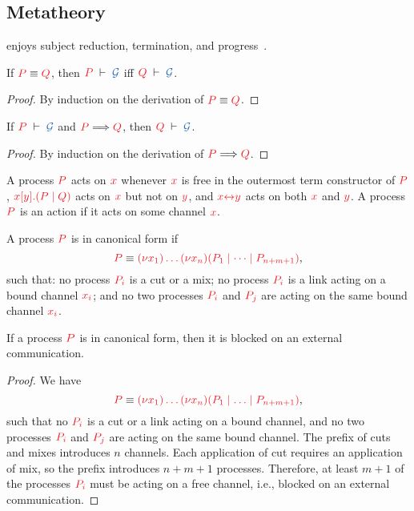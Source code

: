 \documentclass[UKenglish]{llncs}
\begin{document}
\subsection{Metatheory}
\label{sec:cp-metatheory}
\hcp enjoys subject reduction, termination, and progress~\citep{kokke2018tlla}.
\begin{lemma}\label{lem:hcp-preservation-equiv}
  If $\tm{P}\equiv\tm{Q}$, then $\seq[P]{\mathcal{G}}$ iff $\seq[Q]{\mathcal{G}}$.
\end{lemma} 
\begin{proof}
  By induction on the derivation of $\tm{P}\equiv\tm{Q}$.
\end{proof}
\begin{theorem}[Preservation]\label{thm:hcp-preservation}
  If $\seq[P]{\mathcal{G}}$ and $\reducesto{P}{Q}$, then $\seq[Q]{\mathcal{G}}$.
\end{theorem} 
\begin{proof}
  By induction on the derivation of $\reducesto{P}{Q}$.
\end{proof}
\begin{definition}[Actions]
  A process $\tm{P}$ acts on $\tm{x}$ whenever $\tm{x}$ is free in the outermost
  term constructor of $\tm{P}$, \eg $\tm{\cpSend{x}{y}{P}{Q}}$ acts on $\tm{x}$
  but not on $\tm{y}$, and $\tm{\cpLink{x}{y}}$ acts on both $\tm{x}$ and $\tm{y}$.
  A process $\tm{P}$ is an action if it acts on some channel $\tm{x}$.
\end{definition}
\begin{definition}
  A process $\tm{P}$ is in canonical form if
  \[
  \tm{P} \equiv \tm{\piNew{x_1}{\dots\piNew{x_n}{(P_1 \mid \dots \mid P_{n+m+1})}}},
  \]
  such that: no process $\tm{P_i}$ is a cut or a mix; no process $\tm{P_i}$ is a link acting on a bound channel $\tm{x_i}$; and no two processes $\tm{P_i}$ and $\tm{P_j}$ are acting on the same bound channel $\tm{x_i}$.
\end{definition}
\begin{corollary}
  If a process $\tm{P}$ is in canonical form, then it is blocked on an external communication.
\end{corollary}
\begin{proof}
  We have
  \[
  \tm{P} \equiv \tm{\piNew{x_1}{\dots\piNew{x_n}{(P_1 \ppar \dots \ppar P_{n+m+1})}}},
  \]
  such that no $\tm{P_i}$ is a cut or a link acting on a bound channel, and no two processes $\tm{P_i}$ and $\tm{P_j}$ are acting on the same bound channel. The prefix of cuts and mixes introduces $n$ channels. Each application of cut requires an application of mix, so the prefix introduces $n+m+1$ processes. Therefore, at least $m+1$ of the processes $\tm{P_i}$ must be acting on a free channel, i.e., blocked on an external communication.
\end{proof}
\end{document}
